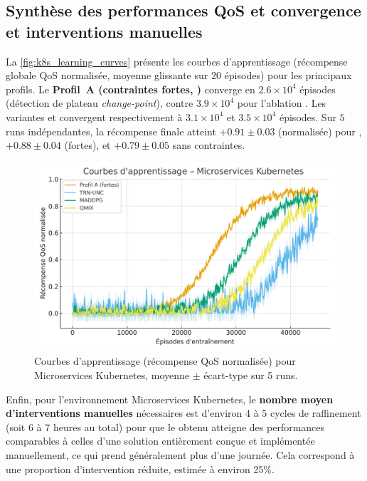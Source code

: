 \subsection*{Synthèse des performances QoS et convergence et interventions manuelles}

La \autoref{fig:k8s_learning_curves} présente les courbes d'apprentissage (récompense globale QoS normalisée, moyenne glissante sur $20$ épisodes) pour les principaux profils.
Le \textbf{Profil~A (contraintes fortes, )} converge en $2.6\times 10^4$ épisodes (détection de plateau \emph{change-point}), contre $3.9\times 10^4$ pour l'ablation .
Les variantes  et  convergent respectivement à $3.1\times 10^4$ et $3.5\times 10^4$ épisodes.
Sur $5$ runs indépendantes, la récompense finale atteint $+0.91 \pm 0.03$ (normalisée) pour , $+0.88 \pm 0.04$ (fortes), et $+0.79 \pm 0.05$ sans contraintes.

\begin{figure}[h!]
  \centering
  \includegraphics[width=0.75\linewidth]{figures/results_k8s_learning.pdf}
  \caption[Courbes d'apprentissage (récompense QoS normalisée) pourMicroservices Kubernetes]{Courbes d'apprentissage (récompense QoS normalisée) pour Microservices Kubernetes, moyenne $\pm$ écart-type sur 5 runs.}
  \label{fig:k8s_learning_curves}
\end{figure}

Enfin, pour l'environnement Microservices Kubernetes, le \textbf{nombre moyen d'interventions manuelles} nécessaires est d'environ 4 à 5 cycles de raffinement (soit 6 à 7 heures au total) pour que le  obtenu atteigne des performances comparables à celles d'une solution entièrement conçue et implémentée manuellement, ce qui prend généralement plus d'une journée. Cela correspond à une proportion d'intervention réduite, estimée à environ 25\%.

